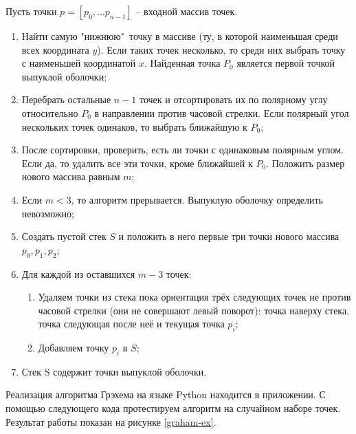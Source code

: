 Пусть точки $p=[p_0,...p_{n-1}]$ -- входной массив точек.
\begin{enumerate}
	\item Найти самую "нижнюю"\ точку в массиве (ту, в которой
наименьшая среди всех координата $y$). Если таких точек несколько, то
среди них выбрать точку с наименьшей координатой $x$. Найденная точка
$P_0$ является первой точкой выпуклой оболочки;
	\item Перебрать остальные $n-1$ точек и отсортировать их по 
полярному углу относительно $P_0$ в направлении против часовой стрелки.
Если полярный угол нескольких точек одинаков, то выбрать ближайшую к 
$P_0$;
	\item После сортировки, проверить, есть ли точки с одинаковым 
полярным углом. Если да, то удалить все эти точки, кроме ближайшей к
$P_0$. Положить размер нового массива равным $m$;
	\item Если $m < 3$, то алгоритм прерывается. Выпуклую оболочку 
определить невозможно;
	\item Создать пустой стек $S$ и положить в него первые три точки 
нового массива $p_0, p_1, p_2$;
	\item Для каждой из оставшихся $m-3$ точек:
	\begin{enumerate}
		\item Удаляем точки из стека пока ориентация трёх следующих
точек не против часовой стрелки (они не совершают левый поворот):
точка наверху стека, точка следующая после неё и текущая точка $p_i$;
		\item Добавляем точку $p_i$ в $S$;
	\end{enumerate}
	\item Стек S содержит точки выпуклой оболочки.
\end{enumerate}

Реализация алгоритма Грэхема на языке Python находится в приложении.
С помощью следующего кода протестируем алгоритм на случайном наборе
точек. Результат работы показан на рисунке \ref{graham-ex}.
 
